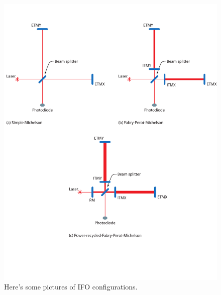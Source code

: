 \begin{figure}[p]
\begin{center}
\includegraphics[width=\linewidth]{figures/inspiral/ifoconfigs}
\end{center}
\caption[Optical Configuration of LIGO]{%
\label{f:ifodesign}%
Here's some pictures of IFO configurations.
}
\end{figure}


